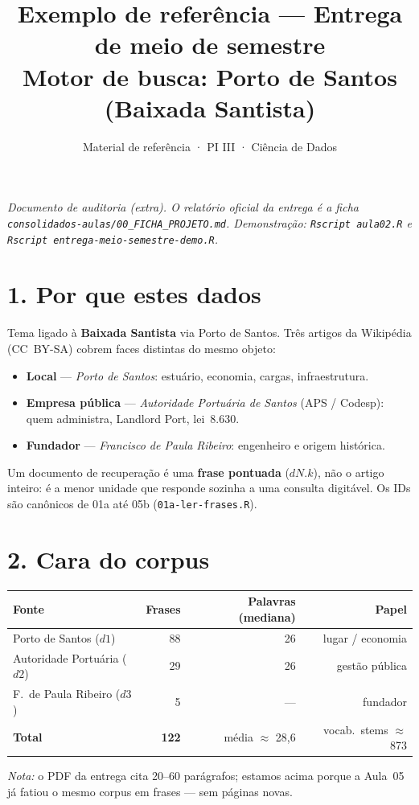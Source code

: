 \documentclass[11pt,a4paper]{article}
\title{\vspace{-1.2cm}\textbf{Exemplo de referência} --- Entrega de meio de semestre\\
\large Motor de busca: Porto de Santos (Baixada Santista)}
\author{\small Material de referência · PI III · Ciência de Dados}
\date{}
\begin{document}
\maketitle
\vspace{-1.2cm}

\noindent\textit{Documento de auditoria (extra). O relatório oficial da entrega é a ficha
\texttt{consolidados-aulas/00\_FICHA\_PROJETO.md}. Demonstração: \texttt{Rscript aula02.R}
e \texttt{Rscript entrega-meio-semestre-demo.R}.}

\section*{1. Por que estes dados}
Tema ligado à \textbf{Baixada Santista} via Porto de Santos. Três artigos da Wikipédia
(CC~BY-SA) cobrem faces distintas do mesmo objeto:

\begin{itemize}
  \setlength\itemsep{0.1em}
  \item \textbf{Local} --- \emph{Porto de Santos}: estuário, economia, cargas, infraestrutura.
  \item \textbf{Empresa pública} --- \emph{Autoridade Portuária de Santos} (APS / Codesp):
        quem administra, Landlord Port, lei~8.630.
  \item \textbf{Fundador} --- \emph{Francisco de Paula Ribeiro}: engenheiro e origem histórica.
\end{itemize}

Um documento de recuperação é uma \textbf{frase pontuada} ($dN.k$), não o artigo inteiro:
é a menor unidade que responde sozinha a uma consulta digitável. Os IDs são canônicos de
01a até 05b (\texttt{01a-ler-frases.R}).

\section*{2. Cara do corpus}
\begin{center}
\begin{tabular}{@{}lrrr@{}}
\toprule
Fonte & Frases & Palavras (mediana) & Papel \\
\midrule
Porto de Santos ($d1$) & 88 & 26 & lugar / economia \\
Autoridade Portuária ($d2$) & 29 & 26 & gestão pública \\
F.\ de Paula Ribeiro ($d3$) & 5 & --- & fundador \\
\midrule
\textbf{Total} & \textbf{122} & média $\approx$ 28,6 & vocab.\ stems $\approx$ 873 \\
\bottomrule
\end{tabular}
\end{center}
\noindent\textit{Nota:} o PDF da entrega cita 20--60 parágrafos; estamos acima porque a Aula~05
já fatiou o mesmo corpus em frases --- sem páginas novas.
\end{document}
